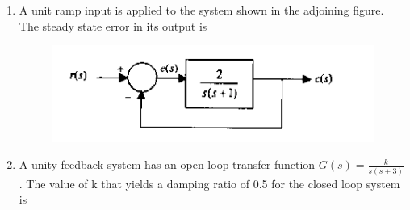 \documentclass[journal,12pt,onecolumn]{IEEEtran}
\theoremstyle{remark}
\begin{document}
\begin{enumerate}
\begin{enumerate}
\begin{figure}[H]
\begin{multicols}{2}
        \caption*{}
        \label{fig:placeholder}
\end{multicols}
\end{figure}
\end{enumerate}

\vspace{0.5cm}

\item A unit ramp input is applied to the system shown in the adjoining figure. The steady state error in its output is
\begin{figure}[h]
    \centering
    \includegraphics[scale=0.75]{q39}
    \caption*{}
    \label{fig:placeholder}
\end{figure}
\hfill{}\begin{enumerate}  \end{enumerate}

\vspace{0.5cm}

\item A unity feedback system has an open loop transfer function $G(s) = \frac{k}{s(s+3)}$. The value of k that yields a damping ratio of 0.5 for the closed loop system is
\hfill{}\begin{enumerate}  \end{enumerate}


\end{enumerate}
\end{document}
